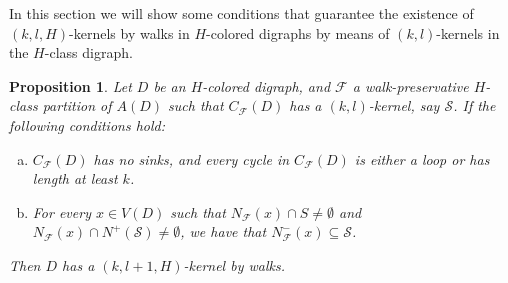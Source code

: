 \documentclass[10pt,a4paper]{article}
\newtheorem{prop}[theorem]{Proposition}
\begin{document}
In this section we will show some conditions that guarantee the existence of $(k,l,H)$-kernels by walks in $H$-colored digraphs by means of $(k,l)$-kernels in the $H$-class digraph.

\begin{prop}
\label{propgird2}
Let $D$ be an $H$-colored digraph, and $\mathscr{F}$ a walk-preservative $H$-class partition of $A(D)$ such that $C_{\mathscr{F}}(D)$ has a $(k,l)$-kernel, say $\mathcal{S}$. If the following conditions hold:
	\begin{enumerate}[a)]
	\item $C_{\mathscr{F}}(D)$ has no sinks, and every cycle in $C_{\mathscr{F}}(D)$ is either a loop or has length at least $k$.
	
	\item For every $x \in V(D)$ such that $N_{\mathscr{F}}(x) \cap S \neq \emptyset $ and $N_{\mathscr{F}}(x) \cap N^{+}(\mathcal{S}) \neq \emptyset$, we have that $N^{-}_{\mathscr{F}}(x) \subseteq \mathcal{S}$.
	\end{enumerate}
Then $D$ has a $(k,l+1,H)$-kernel by walks.
\end{prop}
\end{document}
